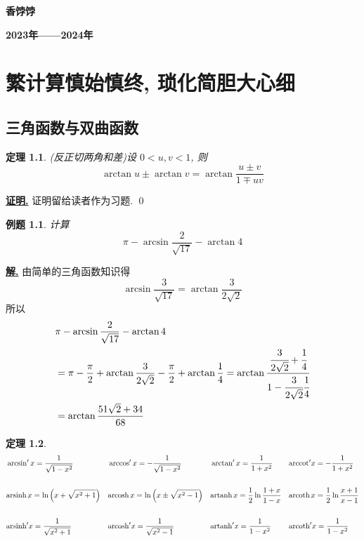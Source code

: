 \documentclass[10pt,a4paper]{book}
\theoremstyle{thmstyle} %
\newtheorem{theorem}{定理}[chapter]
\theoremstyle{defstyle} %
\theoremstyle{prostyle} %
\newtheorem{example}{例题}[chapter]
\renewenvironment{proof}[1][证明]{\par{\kaishu \uline{\textbf{#1.}}} \;\fangsong}{\qed\par}
\newenvironment{solution}{\par\underline{\textbf{解.}} \;\kaishu}{\par}
\begin{document}
	\hfill \textbf{香饽饽}\quad\quad\enspace\:
	
	\hfill \textbf{2023年——2024年}
	
	
	\tableofcontents
	
	\clearpage
	
	\mainmatter
	\setcounter{page}{1} %
	
	\chapter{繁计算慎始慎终, 琐化简胆大心细}
	\section{三角函数与双曲函数}
	\begin{theorem}
		(反正切两角和差)设 $0<u,v<1$, 则
		\begin{equation}
			\arctan u\pm \arctan v=\arctan\frac{u\pm v}{1\mp uv}
		\end{equation}
	\end{theorem}
	\begin{proof}
		证明留给读者作为习题.
	\end{proof}
	\begin{example}
		计算
		$$
		\pi -\arcsin \frac{2}{\sqrt{17}}-\arctan 4
		$$
	\end{example}
	\begin{solution}
		由简单的三角函数知识得
		$$
		\arcsin \frac{3}{\sqrt{17}}= \arctan \frac{3}{2\sqrt{2}}
		$$
		所以
		\begin{align*}
			&\pi - \arcsin \frac{2}{\sqrt{17}}- \arctan 4 \\
			&=\pi -\frac{\pi}{2}+ \arctan \frac{3}{2\sqrt{2}}-\frac{\pi}{2}+ \arctan \frac{1}{4} 
			= \arctan \frac{\cfrac{3}{2\sqrt{2}}+\cfrac{1}{4}}{1-\cfrac{3}{2\sqrt{2}}\cfrac{1}{4}} \\
			&= \arctan \frac{51\sqrt{2}+34}{68}
		\end{align*}
	\end{solution}
	    \begin{theorem}
		\begin{align*}
			&\arcsin'x=\frac{1}{\sqrt{1-x^2}}&&\arccos'x=-\frac{1}{\sqrt{1-x^2}}&& \arctan'x=\frac{1}{1+x^2} && \mathrm{arccot} 'x=-\frac{1}{1+x^2} \\\\
			&\mathrm{arsinh}\thinspace x=\ln \left( x+\sqrt{x^2+1} \right)  &&\mathrm{arcosh}\thinspace x=\ln \left( x\pm\sqrt{x^2-1} \right)  &&\mathrm{artanh}\thinspace x=\frac{1}{2}\ln \frac{1+x}{1-x} &&\mathrm{arcoth}\thinspace x=\frac{1}{2}\ln \frac{x+1}{x-1}\\\\
			&\mathrm{arsinh}' x=\frac{1}{\sqrt{x^2+1}}&&\mathrm{arcosh}' x=\frac{1}{\sqrt{x^2-1}}&&\mathrm{artanh}' x=\frac{1}{1-x^2}&&\mathrm{arcoth}' x=\frac{1}{1-x^2}
		\end{align*}
	\end{theorem}
\end{document}
